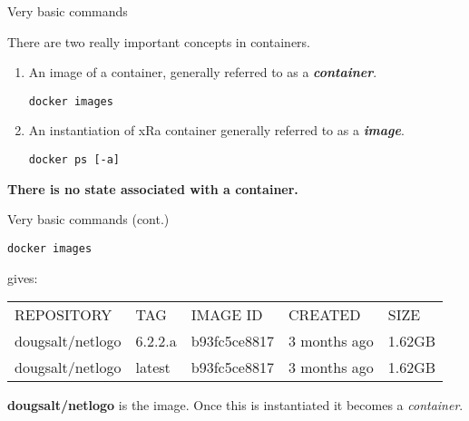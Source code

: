 \documentclass[usenames,dvipsnames,10pt]{beamer}
\begin{document}
\begin{frame}{Very basic commands}
    
    \vfill
    There are two really important concepts in containers.
    \vfill
    \begin{enumerate}
        \item An image of a container, generally referred to as a \textit{\textbf{container}}. 
        
                {\color{blue}\texttt{docker images}}
                
        \item An instantiation of xRa container generally referred to as a \textit{\textbf{image}}.

                {\color{blue}\texttt{docker ps [-a]}} 

    \end{enumerate}
    \vfill
    
    \textbf{\huge {\color{red}There is no state associated with a container.}}
    
  
\end{frame}

\begin{frame}{Very basic commands (cont.)}

{\color{blue}\texttt{docker images}}

\vfill

gives:

\vfill
\small
\begin{tabularx}{\columnwidth}{ l l l l l }
REPOSITORY & TAG & IMAGE ID & CREATED & SIZE \\
dougsalt/netlogo &   6.2.2.a &  b93fc5ce8817 &  3 months ago &  1.62GB \\
dougsalt/netlogo &  latest &   b93fc5ce8817 &  3 months ago  & 1.62GB \\
\end{tabularx}

\vfill
\normalsize
\textbf{dougsalt/netlogo} is the image. Once this is instantiated it becomes a \textit{container}.

\end{frame}
\end{document}
